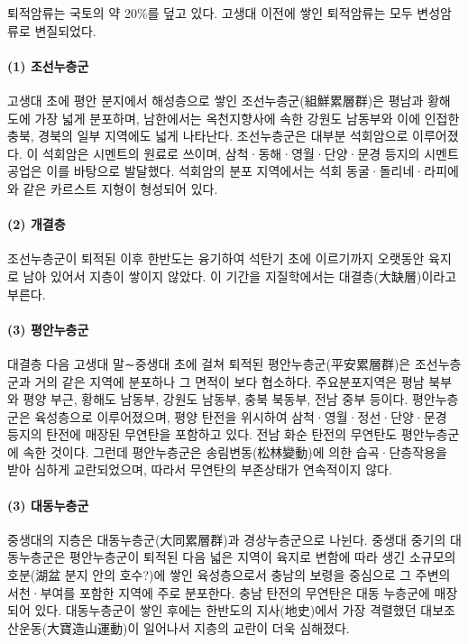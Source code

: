 \documentclass[12pt, a4paper, twoside]{book}
\begin{document}
				퇴적암류는 국토의 약 20\%를 덮고 있다. 
				고생대 이전에 쌓인 퇴적암류는 모두 변성암류로 변질되었다. 

			\paragraph{(1) 조선누층군}
			고생대 초에 평안 분지에서 해성층으로 쌓인 조선누층군(組鮮累層群)은 평남과 황해도에 가장 넓게 분포하며, 
			남한에서는 옥천지향사에 속한 강원도 남동부와 이에 인접한 충북, 경북의 일부 지역에도 넓게 나타난다. 
			조선누층군은 대부분 석회암으로 이루어졌다. 
			이 석회암은 시멘트의 원료로 쓰이며, 삼척·동해·영월·단양·문경 등지의 시멘트공업은 이를 바탕으로 발달했다. 
			석회암의 분포 지역에서는 석회 동굴·돌리네·라피에와 같은 카르스트 지형이 형성되어 있다. 


			\paragraph{(2) 개결층}
			조선누층군이 퇴적된 이후 한반도는 융기하여 석탄기 초에 이르기까지 오랫동안 육지로 남아 있어서 지층이 쌓이지 않았다. 
			이 기간을 지질학에서는 대결층(大缺層)이라고 부른다. 


			\paragraph{(3) 평안누층군}

			대결층 다음 고생대 말∼중생대 초에 걸쳐 퇴적된 평안누층군(平安累層群)은 조선누층군과 거의 같은 지역에 분포하나 그 면적이 보다 협소하다. 
			주요분포지역은 평남 북부와 평양 부근, 황해도 남동부, 강원도 남동부, 충북 북동부, 전남 중부 등이다. 
			평안누층군은 육성층으로 이루어졌으며, 평양 탄전을 위시하여 삼척·영월·정선·단양·문경 등지의 탄전에 매장된 무연탄을 포함하고 있다. 
			전남 화순 탄전의 무연탄도 평안누층군에 속한 것이다. 
			그런데 평안누층군은 송림변동(松林變動)에 의한 습곡·단층작용을 받아 심하게 교란되었으며, 따라서 무연탄의 부존상태가 연속적이지 않다. 



			\paragraph{(3) 대동누층군}
			중생대의 지층은 대동누층군(大同累層群)과 경상누층군으로 나뉜다. 
			중생대 중기의 대동누층군은 평안누층군이 퇴적된 다음 
			넓은 지역이 육지로 변함에 따라 생긴 소규모의 호분(湖盆 분지 안의 호수?)에 쌓인 육성층으로서 
			충남의 보령을 중심으로 그 주변의 서천·부여를 포함한 지역에 주로 분포한다. 
			충남 탄전의 무연탄은 대동 누층군에 매장되어 있다. 
			대동누층군이 쌓인 후에는 한반도의 지사(地史)에서 가장 격렬했던 대보조산운동(大寶造山運動)이 일어나서 지층의 교란이 더욱 심해졌다. 
\end{document}
